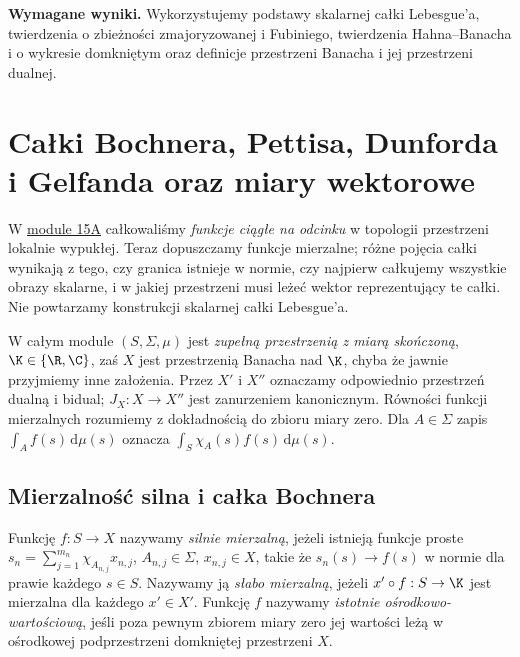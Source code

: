 \setcounter{section}{15}
\noindent\textbf{Wymagane wyniki.} Wykorzystujemy podstawy skalarnej całki Lebesgue'a, twierdzenia o zbieżności zmajoryzowanej i Fubiniego, twierdzenia Hahna--Banacha i o wykresie domkniętym oraz definicje przestrzeni Banacha i jej przestrzeni dualnej.\medskip
\begingroup
\renewcommand{\thesection}{15B}
\renewcommand{\theHsection}{15B}
\section{Całki Bochnera, Pettisa, Dunforda i Gelfanda oraz miary wektorowe}
\label{sec:integral-vector15b}

W \hyperref[sec:integral-lcs15a]{module 15A} całkowaliśmy \emph{funkcje ciągłe na odcinku} w topologii
przestrzeni lokalnie wypukłej. Teraz dopuszczamy funkcje mierzalne;
różne pojęcia całki wynikają z tego, czy granica istnieje w normie,
czy najpierw całkujemy wszystkie obrazy skalarne, i w jakiej przestrzeni
musi leżeć wektor reprezentujący te całki. Nie powtarzamy konstrukcji
skalarnej całki Lebesgue'a.

W całym module $(S,\Sigma,\mu)$ jest \emph{zupełną przestrzenią z miarą
skończoną}, $\K\in\{\R,\C\}$, zaś $X$ jest przestrzenią Banacha nad
$\K$, chyba że jawnie przyjmiemy inne założenia. Przez $X'$ i $X''$
oznaczamy odpowiednio przestrzeń dualną i bidual; $J_X:X\to X''$
jest zanurzeniem kanonicznym. Równości funkcji mierzalnych rozumiemy
z dokładnością do zbioru miary zero. Dla $A\in\Sigma$ zapis
$\int_A f(s)\,\mathrm d\mu(s)$ oznacza $\int_S\chi_A(s)f(s)\,\mathrm d\mu(s)$.

\subsection{Mierzalność silna i całka Bochnera}

\begin{definicja}
\label{def:measurability15b}
Funkcję $f:S\to X$ nazywamy \emph{silnie mierzalną}, jeżeli istnieją
funkcje proste $s_n=\sum_{j=1}^{m_n}\chi_{A_{n,j}}x_{n,j}$,
$A_{n,j}\in\Sigma$, $x_{n,j}\in X$, takie że $s_n(s)\to f(s)$
w normie dla prawie każdego $s\in S$. Nazywamy ją
\emph{słabo mierzalną}, jeżeli $x'\circ f:S\to\K$ jest
mierzalna dla każdego $x'\in X'$. Funkcję $f$ nazywamy
\emph{istotnie ośrodkowo-wartościową}, jeśli poza pewnym zbiorem
miary zero jej wartości leżą w ośrodkowej podprzestrzeni domkniętej
przestrzeni $X$.
\end{definicja}

